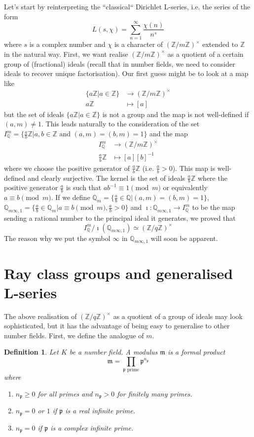 \documentclass[]{amsart}
\newtheorem{defn}{Definition}
\newcommand{\Z}{\mathbb{Z}}
\newcommand{\Q}{\mathbb{Q}}
\newcommand{\rarr}{\longrightarrow}
\newcommand{\m}{\mathfrak{m}}
\newcommand{\p}{\mathfrak{p}}
\begin{document}
Let's start by reinterpreting the ``classical`` Dirichlet L-series, i.e. the series of the form
\[L(s,\chi)=\sum_{n=1}^\infty \frac{\chi(n)}{n^{s}}\]
where $s$ is a complex number and $\chi$ is a character of $(\Z/m\Z)^\times$ extended to $\Z$ in the natural way. First, we want realise $(\Z/m\Z)^\times$ as a quotient of a certain group of (fractional) ideals (recall that in number fields, we need to consider ideals to recover unique factorisation). Our first guess might be to look at a map like
\begin{align*}
	\{a\Z|a\in\Z\} &\rarr (\Z/m\Z)^\times \\
	a\Z &\longmapsto [a]
\end{align*}
but the set of ideals $\{a\Z|a\in\Z\}$ is not a group and the map is not well-defined if $(a,m)\neq1$. This leads naturally to the consideration of the set $I^m_\Q=\{\frac{a}{b}\Z|a,b\in\Z\text{ and }(a,m)=(b,m)=1\}$ and the map
\begin{align*}
	I^m_\Q &\rarr (\Z/m\Z)^\times \\
	\frac{a}{b}\Z &\longmapsto [a][b]^{-1}
\end{align*}
where we choose the positive generator of $\frac{a}{b}\Z$ (i.e. $\frac{a}{b}>0$). This map is well-defined and clearly surjective. The kernel is the set of ideals $\frac{a}{b}\Z$ where the positive generator $\frac{a}{b}$ is such that $ab^{-1}\equiv 1\pmod m$ or equivalently $a\equiv b\pmod m$. If we define $\Q_{m}=\{\frac{a}{b}\in\Q|(a,m)=(b,m)=1\}$,  $\Q_{m\infty,1}=\{\frac{a}{b}\in\Q_m|a\equiv b\pmod m,\frac{a}{b}>0\}$ and $\imath:\Q_{m\infty,1}\rarr I^m_\Q$ to be the map sending a rational number to the principal ideal it generates, we proved that
\[I^m_\Q/\imath(\Q_{m\infty,1})\simeq (\Z/q\Z)^\times\]
The reason why we put the symbol $\infty$ in $\Q_{m\infty,1}$ will soon be apparent. 

\section{Ray class groups and generalised L-series}
The above realisation of $(\Z/q\Z)^\times$ as a quotient of a group of ideals may look sophisticated, but it has the advantage of being easy to generalise to other number fields. First, we define the analogue of $m$.

\begin{defn}
	Let $K$ be a number field. A modulus $\m$ is a formal product
	\[\m=\prod_{\p\text{ prime}}\p^{n_\p}\]
	where
	\begin{enumerate}
		\item $n_\p\geq 0$ for all primes and $n_\p>0$ for finitely many primes.
		\item $n_\p=0$ or $1$ if $\p$ is a real infinite prime.
		\item $n_\p=0$ if $\p$ is a complex infinite prime. 
	\end{enumerate}
\end{defn}
\end{document}
